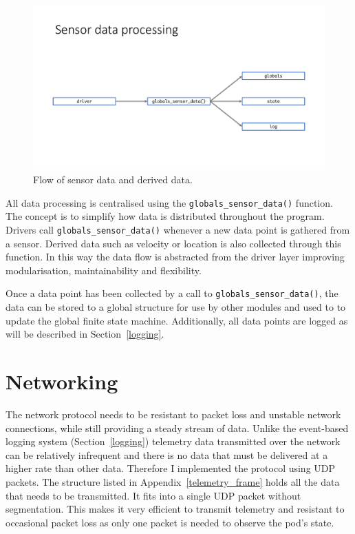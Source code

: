 \begin{figure}[H]
    \centering \includegraphics[width=1.0\textwidth]{./figures/dataflow.pdf}
    \caption{Flow of sensor data and derived data.}
    \label{fig:dataflow}
\end{figure}

All data processing is centralised using the \texttt{globals_sensor_data()} function. The concept is to simplify how data is distributed throughout the program. Drivers call \texttt{globals_sensor_data()} whenever a new data point is gathered from a sensor. Derived data such as velocity or location is also collected through this function. In this way the data flow is abstracted from the driver layer improving modularisation, maintainability and flexibility.

Once a data point has been collected by a call to \texttt{globals_sensor_data()}, the data can be stored to a global structure for use by other modules and used to to update the global finite state machine. Additionally, all data points are logged as will be described in Section~\ref{logging}.

\section{Networking}

The network protocol needs to be resistant to packet loss and unstable network connections, while still providing a steady stream of data. Unlike the event-based logging system (Section~\ref{logging}) telemetry data transmitted over the network can be relatively infrequent and there is no data that must be delivered at a higher rate than other data. Therefore I implemented the protocol using UDP packets. The structure listed in Appendix~\ref{telemetry_frame} holds all the data that needs to be transmitted. It fits into a single UDP packet without segmentation. This makes it very efficient to transmit telemetry and resistant to occasional packet loss as only one packet is needed to observe the pod's state.

